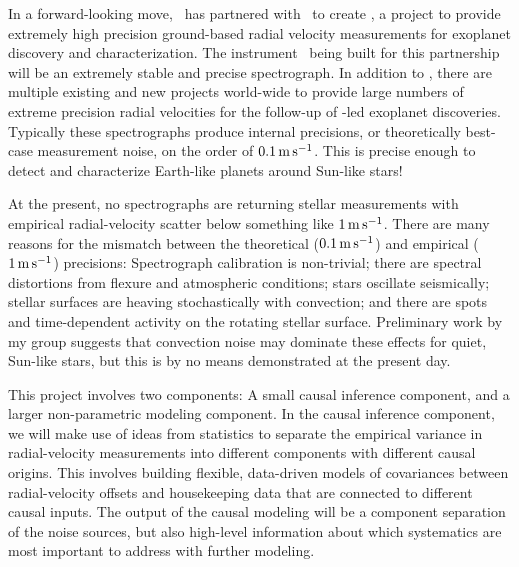 \documentclass[12pt, fullpage, letterpaper]{article}
\begin{document}
In a forward-looking move, \NASA\ has partnered with \NSF\ to create
\NNEXPLORE, a project to provide extremely high precision ground-based
radial velocity measurements for exoplanet discovery and
characterization. The instrument \NEID\ being built for this
partnership will be an extremely stable and precise spectrograph. In
addition to \NEID, there are multiple existing and new projects
world-wide to provide large numbers of extreme precision radial
velocities for the follow-up of \NASA-led exoplanet
discoveries. Typically these spectrographs produce internal
precisions, or theoretically best-case measurement noise, on the order
of $0.1\,{\mathrm{m\,s^{-1}}}$. This is precise enough to detect and characterize
Earth-like planets around Sun-like stars!

At the present, no spectrographs are returning stellar measurements
with empirical radial-velocity scatter below something like $1\,{\mathrm{m\,s^{-1}}}$.
There are many reasons for the mismatch between the theoretical
($0.1\,{\mathrm{m\,s^{-1}}}$) and empirical ($1\,{\mathrm{m\,s^{-1}}}$) precisions: Spectrograph calibration
is non-trivial; there are spectral distortions from flexure and
atmospheric conditions; stars oscillate seismically; stellar surfaces
are heaving stochastically with convection; and there are spots and
time-dependent activity on the rotating stellar surface. Preliminary
work by my group suggests that convection noise may dominate these
effects for quiet, Sun-like stars, but this is by no means
demonstrated at the present day.

This project involves two components: A small causal inference
component, and a larger non-parametric modeling component. In the
causal inference component, we will make use of ideas from statistics
to separate the empirical variance in radial-velocity measurements
into different components with different causal origins. This involves
building flexible, data-driven models of covariances between
radial-velocity offsets and housekeeping data that are connected to
different causal inputs. The output of the causal modeling will be a
component separation of the noise sources, but also high-level
information about which systematics are most important to address with
further modeling.
\end{document}
